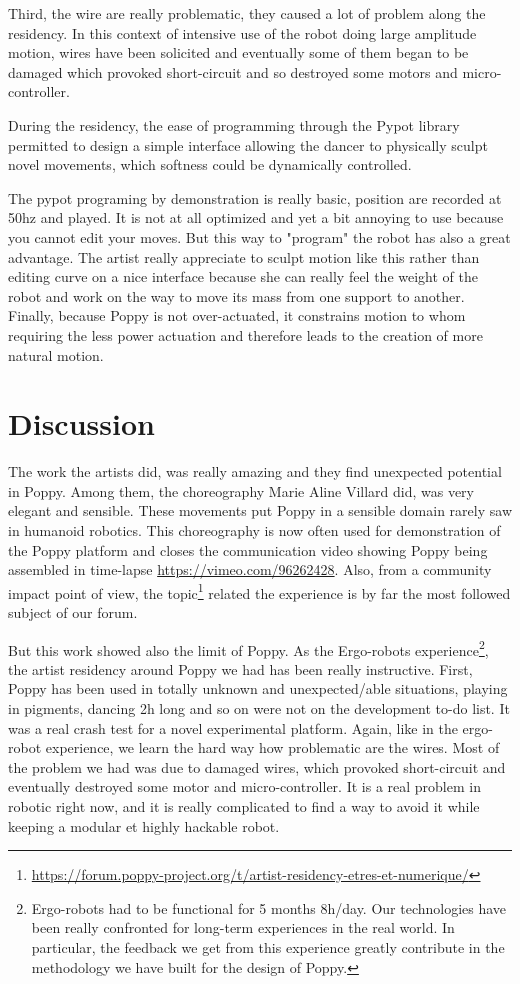 Third, the wire are really problematic, they caused a lot of problem along the residency. In this context of intensive use of the robot doing large amplitude motion, wires have been solicited and eventually some of them began to be damaged which provoked short-circuit and so destroyed some motors and micro-controller.

During the residency, the ease of programming through the Pypot library permitted to design a simple interface allowing the dancer to physically sculpt novel movements, which softness could be dynamically controlled.

The pypot programing by demonstration is really basic, position are recorded at 50hz and played. It is not at all optimized and yet a bit annoying to use because you cannot edit your moves. But this way to "program" the robot has also a great advantage. The artist really appreciate to sculpt motion like this rather than editing curve on a nice interface because she can really feel the weight of the robot and work on the way to move its mass from one support to another. Finally, because Poppy is not over-actuated, it constrains motion to whom requiring the less power actuation and therefore leads to the creation of more natural motion.


\section{Discussion} %

The work the artists did, was really amazing and they find unexpected potential in Poppy. Among them, the choreography Marie Aline Villard did, was very elegant and sensible. These movements put Poppy in a sensible domain rarely saw in humanoid robotics. This choreography is now often used for demonstration of the Poppy platform and closes the communication video showing Poppy being assembled in time-lapse \url{https://vimeo.com/96262428}.
Also, from a community impact point of view, the topic\footnote{\url{https://forum.poppy-project.org/t/artist-residency-etres-et-numerique/}} related the experience is by far the most followed subject of our forum.

But this work showed also the limit of Poppy. As the Ergo-robots experience\footnote{Ergo-robots had to be functional for 5 months 8h/day. Our technologies have been really confronted for long-term experiences in the real world. In particular, the feedback we get from this experience greatly contribute in the methodology we have built for the design of Poppy.}, the artist residency around Poppy we had has been really instructive. First, Poppy has been used in totally unknown and unexpected/able situations, playing in pigments, dancing 2h long and so on were not on the development to-do list.
It was a real crash test for a novel experimental platform. Again, like in the ergo-robot experience, we learn the hard way how problematic are the wires. Most of the problem we had was due to damaged wires, which provoked short-circuit and eventually destroyed some motor and micro-controller. It is a real problem in robotic right now, and it is really complicated to find a way to avoid it while keeping a modular et highly hackable robot.

